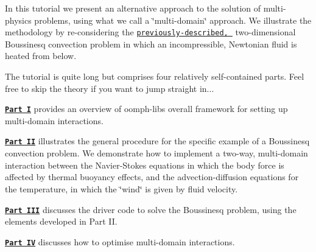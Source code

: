 In this tutorial we present an alternative approach to the solution of multi-\/physics problems, using what we call a \char`\"{}multi-\/domain\char`\"{} approach. We illustrate the methodology by re-\/considering the \href{../../b_convection/html/index.html}{\tt previously-\/described, } two-\/dimensional Boussinesq convection problem in which an incompressible, Newtonian fluid is heated from below.

The tutorial is quite long but comprises four relatively self-\/contained parts. Feel free to skip the theory if you want to jump straight in... ~\newline
~\newline

\begin{DoxyItemize}
\item \href{#setting_up}{\tt {\bfseries Part I}} provides an overview of {\ttfamily oomph-\/lib\textquotesingle{}s} overall framework for setting up multi-\/domain interactions. ~\newline
~\newline

\item \href{#implement_boussinesq}{\tt {\bfseries Part II}} illustrates the general procedure for the specific example of a Boussinesq convection problem. We demonstrate how to implement a two-\/way, multi-\/domain interaction between the Navier-\/\+Stokes equations in which the body force is affected by thermal buoyancy effects, and the advection-\/diffusion equations for the temperature, in which the \char`\"{}wind\char`\"{} is given by fluid velocity. ~\newline
~\newline

\item \href{#multi_domain_boussinesq}{\tt {\bfseries Part I\+II}} discusses the driver code to solve the Boussinesq problem, using the elements developed in Part II. ~\newline
~\newline

\item \href{#optimise}{\tt {\bfseries Part IV}} discusses how to optimise multi-\/domain interactions.
\end{DoxyItemize}

